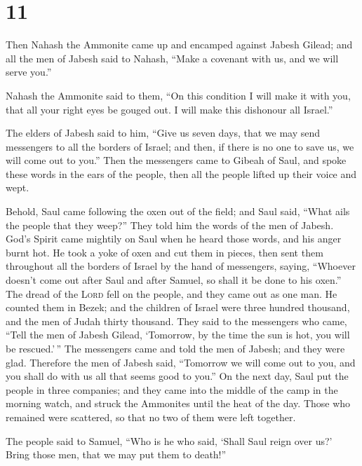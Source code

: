 \hypertarget{section-10}{%
\section{11}\label{section-10}}

 Then Nahash the Ammonite came up and encamped against
Jabesh Gilead; and all the men of Jabesh said to Nahash, ``Make a
covenant with us, and we will serve you.''

 Nahash the Ammonite said to them, ``On this condition I
will make it with you, that all your right eyes be gouged out. I will
make this dishonour all Israel.''

 The elders of Jabesh said to him, ``Give us seven days,
that we may send messengers to all the borders of Israel; and then, if
there is no one to save us, we will come out to you.'' 
Then the messengers came to Gibeah of Saul, and spoke these words in the
ears of the people, then all the people lifted up their voice and wept.

 Behold, Saul came following the oxen out of the field;
and Saul said, ``What ails the people that they weep?'' They told him
the words of the men of Jabesh.  God's Spirit came
mightily on Saul when he heard those words, and his anger burnt hot.
 He took a yoke of oxen and cut them in pieces, then sent
them throughout all the borders of Israel by the hand of messengers,
saying, ``Whoever doesn't come out after Saul and after Samuel, so shall
it be done to his oxen.'' The dread of the \textsc{Lord} fell on the
people, and they came out as one man.  He counted them in
Bezek; and the children of Israel were three hundred thousand, and the
men of Judah thirty thousand.  They said to the messengers
who came, ``Tell the men of Jabesh Gilead, `Tomorrow, by the time the
sun is hot, you will be rescued.'\,'' The messengers came and told the
men of Jabesh; and they were glad.  Therefore the men of
Jabesh said, ``Tomorrow we will come out to you, and you shall do with
us all that seems good to you.''  On the next day, Saul
put the people in three companies; and they came into the middle of the
camp in the morning watch, and struck the Ammonites until the heat of
the day. Those who remained were scattered, so that no two of them were
left together.

 The people said to Samuel, ``Who is he who said, `Shall
Saul reign over us?' Bring those men, that we may put them to death!''

